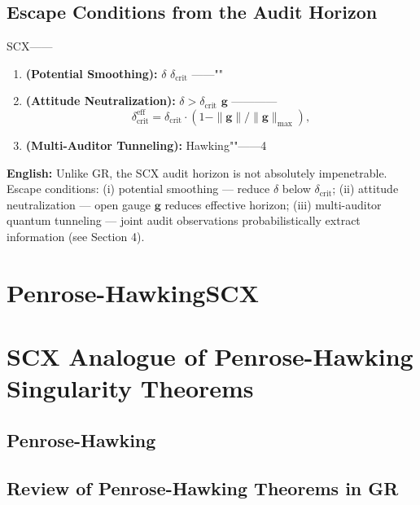 \documentclass[12pt,a4paper]{article}
\theoremstyle{remark}
\newcommand{\g}{\mathbf{g}}
\begin{document}
\subsection{}
\subsection{Escape Conditions from the Audit Horizon}

\noindent
\textbf{} SCX——

\begin{enumerate}[label=(\roman*)]
    \item \textbf{ (Potential Smoothing):}  $\delta$  $\delta_{\mathrm{crit}}$ ——""
    \item \textbf{ (Attitude Neutralization):}  $\delta > \delta_{\mathrm{crit}}$ $\g$ ————
    \begin{equation}
        \delta_{\mathrm{crit}}^{\mathrm{eff}} = \delta_{\mathrm{crit}} \cdot (1 - \|\g\|/\|\g\|_{\max}),
    \end{equation}
    
    \item \textbf{ (Multi-Auditor Tunneling):} Hawking""——4
\end{enumerate}

\vspace{4pt}
\noindent
\textbf{English:} Unlike GR, the SCX audit horizon is not absolutely impenetrable. Escape conditions: (i) potential smoothing — reduce $\delta$ below $\delta_{\mathrm{crit}}$; (ii) attitude neutralization — open gauge $\g$ reduces effective horizon; (iii) multi-auditor quantum tunneling — joint audit observations probabilistically extract information (see Section 4).

\section{Penrose-HawkingSCX}
\section{SCX Analogue of Penrose-Hawking Singularity Theorems}

\subsection{Penrose-Hawking}
\subsection{Review of Penrose-Hawking Theorems in GR}
\end{document}
